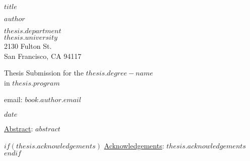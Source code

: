 \pagestyle{empty}

\begin{titlepage}
\singlespacing
\begin{center}
\Huge
{\bf {$title$}}

\vspace*{2.0cm}


{\Large {$author$}}

\vspace*{0.5cm}

\normalsize
$thesis.department$\\
$thesis.university$\\
2130 Fulton St.\\
San Francisco, CA 94117\\

\vspace*{0.5cm}

\normalsize
Thesis Submission for the $thesis.degree-name$\\
in $thesis.program$\\

\vspace*{0.5cm}

\normalsize
email: \textit{$book.author.email$}\\

\vspace*{0.5cm}

{\normalsize $date$}

\vspace*{2.0cm}

\begin{flushleft}

\normalsize \underline{Abstract}: $abstract$

$if(thesis.acknowledgements)$
  \vspace*{0.5cm}
  {\normalsize \underline{Acknowledgements}: $thesis.acknowledgements$}
$endif$

\end{flushleft}


\end{center}
\end{titlepage}

